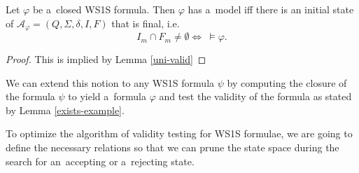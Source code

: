 \begin{lemma}\label{exists-example}
Let $\varphi$ be a~closed WS1S formula. Then $\varphi$ has a~model
iff there is an initial state of $\mathcal{A}_\varphi = (Q, \Sigma, \delta, I,
F)$ that is final, i.e.
\begin{equation}
 I_m \cap F_m \neq \emptyset \Leftrightarrow\ \models \varphi.
\end{equation}
\end{lemma}

\begin{proof}
This is implied by Lemma \ref{uni-valid}
\end{proof}

We can extend this notion to any WS1S formula $\psi$ by computing the
closure of the formula $\psi$ to yield a~formula $\varphi$ and test the validity
of the formula as stated by Lemma \ref{exists-example}.

% 
% 

To optimize the algorithm of validity testing for WS1S formulae, we are going
to define the necessary relations so that we can prune the state space during
the search for an~accepting or a~rejecting state. 

